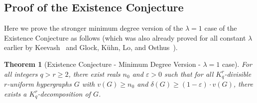 \documentclass[11pt]{article}
\newcounter{i}
\theoremstyle{plain}
\newtheorem{thm}{Theorem}[section]
\theoremstyle{plain} %
\theoremstyle{definition}
\begin{document}
\subsection{Proof of the Existence Conjecture}

Here we prove the stronger minimum degree version of the $\lambda=1$ case of the Existence Conjecture as follows (which was also already proved for all constant $\lambda$ earlier by Keevash~\cite{K14} and Glock, K\"{u}hn, Lo, and Osthus~\cite{GKLO16}).

\begin{thm}[Existence Conjecture - Minimum Degree Version - $\lambda=1$ case]\label{thm:ExistenceMinDegree}
For all integers $q > r \geq 2$, there exist reals $n_0$ and $\varepsilon > 0$ such that for all $K_q^r$-divisible $r$-uniform hypergraphs $G$ with $v(G)\ge n_0$ and $\delta(G) \ge (1-\varepsilon)\cdot v(G)$, there exists a $K_q^r$-decomposition of $G$.
\end{thm}
\end{document}
